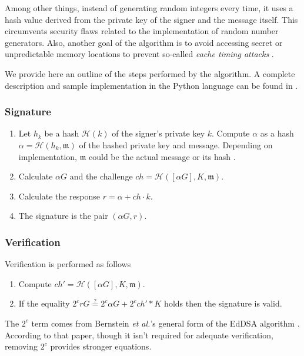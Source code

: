 Among other things, instead of generating random integers every time, it uses a hash value derived from the private key of the signer and the message itself. This circumvents security flaws related to the implementation of random number generators. Also, another goal of the algorithm is to avoid accessing secret or unpredictable memory locations to prevent so-called {\em cache timing attacks} \cite{Bernstein2012}.

We provide here an outline of the steps performed by the algorithm. A complete description and sample implementation in the Python language can be found in \cite{rfc8032}. 

\subsubsection*{Signature}

\begin{enumerate}
	\item Let \(h_k\) be a hash \(\mathcal{H}(k)\) of the signer's private key \(k\). 
	Compute \(\alpha\) as a hash \(\alpha = \mathcal{H}(h_k, \mathfrak{m})\) of the hashed private key and message. Depending on implementation, $\mathfrak{m}$ could be the actual message or its hash \cite{rfc8032}.
	
	\item Calculate \(\alpha G\) and the challenge $ch = \mathcal{H}([\alpha G], K,  \mathfrak{m})$.

	\item Calculate the response \(r = \alpha + ch \cdot k \).
	
	\item The signature is the pair \((\alpha G, r)\).
\end{enumerate}

\subsubsection*{Verification}
Verification is performed as follows

\begin{enumerate}
	\item Compute \(ch' = \mathcal{H}([\alpha G], K,  \mathfrak{m})\).
	
	\item If the equality \(2^c r G \stackrel{?}{=} 2^c \alpha G + 2^c ch'*K \) holds then the signature is valid.
\end{enumerate}

The $2^c$ term comes from Bernstein {\em et al.}’s general form of the EdDSA algorithm \cite{Bernstein2012}. According to that paper, though it isn’t required for adequate verification, removing $2^c$ provides stronger equations.

